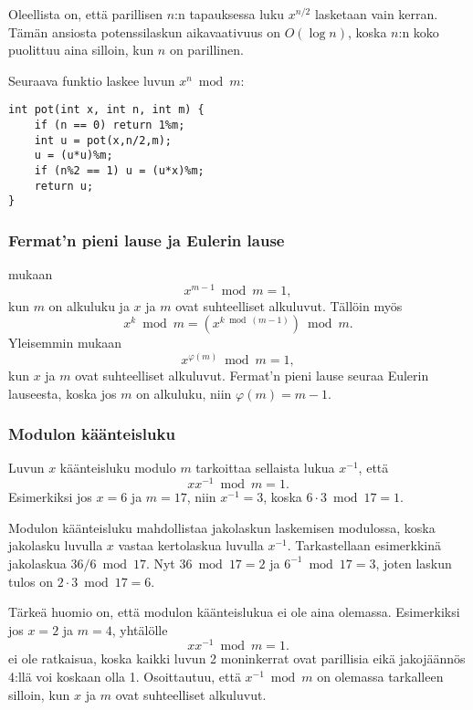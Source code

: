 Oleellista on, että parillisen $n$:n
tapauksessa luku $x^{n/2}$ lasketaan vain kerran.
Tämän ansiosta potenssilaskun aikavaativuus on $O(\log n)$,
koska $n$:n koko puolittuu aina silloin,
kun $n$ on parillinen.

Seuraava funktio laskee luvun $x^n \bmod m$:

\begin{lstlisting}
int pot(int x, int n, int m) {
    if (n == 0) return 1%m;
    int u = pot(x,n/2,m);
    u = (u*u)%m;
    if (n%2 == 1) u = (u*x)%m;
    return u;
}
\end{lstlisting}

\subsubsection{Fermat'n pieni lause ja Eulerin lause}


 mukaan
\[x^{m-1} \bmod m = 1,\]
kun $m$ on alkuluku ja $x$ ja $m$ ovat suhteelliset alkuluvut.
Tällöin myös
\[x^k \bmod m = (x^{k \bmod (m-1)}) \bmod m.\]
Yleisemmin  mukaan
\[x^{\varphi(m)} \bmod m = 1,\]
kun $x$ ja $m$ ovat suhteelliset alkuluvut.
Fermat'n pieni lause seuraa Eulerin lauseesta,
koska jos $m$ on alkuluku, niin $\varphi(m)=m-1$.

\subsubsection{Modulon käänteisluku}


Luvun $x$ käänteisluku modulo $m$
tarkoittaa sellaista lukua $x^{-1}$,
että
\[ x x^{-1} \bmod m = 1. \]
Esimerkiksi jos $x=6$ ja $m=17$,
niin $x^{-1}=3$, koska $6\cdot3 \bmod 17=1$.

Modulon käänteisluku mahdollistaa
jakolaskun laskemisen modulossa,
koska jakolasku luvulla $x$ vastaa
kertolaskua luvulla $x^{-1}$.
Tarkastellaan esimerkkinä jakolaskua $36/6 \bmod 17$.
Nyt $36 \bmod 17 = 2$ ja $6^{-1} \bmod 17 = 3$,
joten laskun tulos on $2 \cdot 3 \bmod 17 = 6$. 

Tärkeä huomio on, että
modulon käänteislukua ei ole aina olemassa.
Esimerkiksi jos $x=2$ ja $m=4$,
yhtälölle
\[ x x^{-1} \bmod m = 1. \]
ei ole ratkaisua, koska kaikki luvun 2
moninkerrat ovat parillisia eikä jakojäännös
4:llä voi koskaan olla 1.
Osoittautuu, että $x^{-1} \bmod m$
on olemassa tarkalleen silloin,
kun $x$ ja $m$ ovat suhteelliset alkuluvut.

